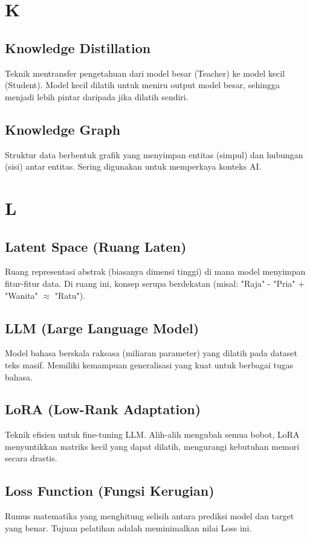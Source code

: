 \section*{K}

\subsection*{Knowledge Distillation}
Teknik mentransfer pengetahuan dari model besar (Teacher) ke model kecil (Student). Model kecil dilatih untuk meniru output model besar, sehingga menjadi lebih pintar daripada jika dilatih sendiri.

\subsection*{Knowledge Graph}
Struktur data berbentuk grafik yang menyimpan entitas (simpul) dan hubungan (sisi) antar entitas. Sering digunakan untuk memperkaya konteks AI.

\section*{L}

\subsection*{Latent Space (Ruang Laten)}
Ruang representasi abstrak (biasanya dimensi tinggi) di mana model menyimpan fitur-fitur data. Di ruang ini, konsep serupa berdekatan (misal: "Raja" - "Pria" + "Wanita" $\approx$ "Ratu").

\subsection*{LLM (Large Language Model)}
Model bahasa berskala raksasa (miliaran parameter) yang dilatih pada dataset teks masif. Memiliki kemampuan generalisasi yang kuat untuk berbagai tugas bahasa.

\subsection*{LoRA (Low-Rank Adaptation)}
Teknik efisien untuk fine-tuning LLM. Alih-alih mengubah semua bobot, LoRA menyuntikkan matriks kecil yang dapat dilatih, mengurangi kebutuhan memori secara drastis.

\subsection*{Loss Function (Fungsi Kerugian)}
Rumus matematika yang menghitung selisih antara prediksi model dan target yang benar. Tujuan pelatihan adalah meminimalkan nilai Loss ini.

